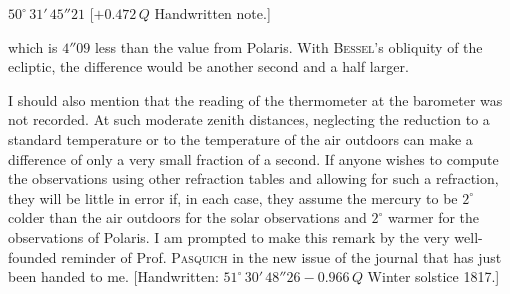 \begin{center}\fontsize{10}{12}\selectfont $50^\circ\,31'\,45''21$ [$+0.472\,Q$ Handwritten note.]\end{center}

\noindent which is $4''09$ less than the value from Polaris. With \textsc{Bessel}’s obliquity of the ecliptic, the difference would be another second and a half larger.

\par\indent I should also mention that the reading of the thermometer at the barometer was not recorded. At such moderate zenith distances, neglecting the reduction to a standard temperature or to the temperature of the air outdoors can make a difference of only a very small fraction of a second. If anyone wishes to compute the observations using other refraction tables and allowing for such a refraction, they will be little in error if, in each case, they assume the mercury to be $2^\circ$ colder than the air outdoors for the solar observations and $2^\circ$ warmer for the observations of Polaris. I am prompted to make this remark by the very well-founded reminder of Prof. \textsc{Pasquich} in the new issue of the journal that has just been handed to me. [Handwritten: $51^\circ\,30'\,48''26 - 0.966\,Q$ Winter solstice 1817.]
